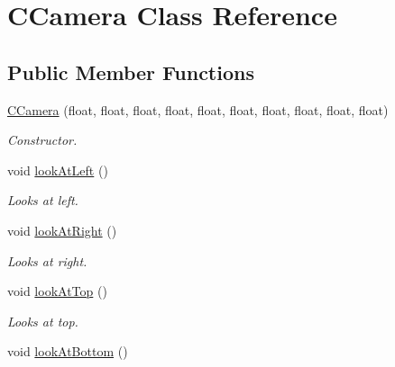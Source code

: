\hypertarget{class_c_camera}{\section{C\-Camera Class Reference}
\label{class_c_camera}
}
\subsection*{Public Member Functions}
\begin{DoxyCompactItemize}
\item 
\hyperlink{class_c_camera_a9fb8772ef9f47e8df722bcd47f2f547c}{C\-Camera} (float, float, float, float, float, float, float, float, float, float)
\begin{DoxyCompactList}\small\item\em Constructor. \end{DoxyCompactList}\item 
\hypertarget{class_c_camera_ac53b52d3935731d3a1889e8f30e0bc5b}{void \hyperlink{class_c_camera_ac53b52d3935731d3a1889e8f30e0bc5b}{look\-At\-Left} ()}\label{class_c_camera_ac53b52d3935731d3a1889e8f30e0bc5b}

\begin{DoxyCompactList}\small\item\em Looks at left. \end{DoxyCompactList}\item 
\hypertarget{class_c_camera_a1466d1d11d7ed868bec760dd50291252}{void \hyperlink{class_c_camera_a1466d1d11d7ed868bec760dd50291252}{look\-At\-Right} ()}\label{class_c_camera_a1466d1d11d7ed868bec760dd50291252}

\begin{DoxyCompactList}\small\item\em Looks at right. \end{DoxyCompactList}\item 
\hypertarget{class_c_camera_a2816add931cb114e9813b86cd04db37c}{void \hyperlink{class_c_camera_a2816add931cb114e9813b86cd04db37c}{look\-At\-Top} ()}\label{class_c_camera_a2816add931cb114e9813b86cd04db37c}

\begin{DoxyCompactList}\small\item\em Looks at top. \end{DoxyCompactList}\item 
\hypertarget{class_c_camera_a3870b73e9d94b679ee44259bf1c6ebdc}{void \hyperlink{class_c_camera_a3870b73e9d94b679ee44259bf1c6ebdc}{look\-At\-Bottom} ()}\label{class_c_camera_a3870b73e9d94b679ee44259bf1c6ebdc}


\end{DoxyCompactItemize}
